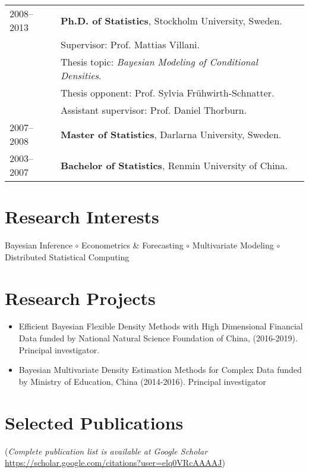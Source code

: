\documentclass[twoside,a4paper,11pt]{amsart}
\begin{document}
\begin{tabular}{ l  p{} l}
  2008--2013 & \textbf{Ph.D. of Statistics}, Stockholm University, Sweden. \\
             & Supervisor: Prof. Mattias Villani.                          \\

             & Thesis topic: \emph{Bayesian Modeling of Conditional Densities}. \\
             & Thesis opponent: Prof. Sylvia Frühwirth-Schnatter.               \\
             & Assistant supervisor: Prof. Daniel Thorburn.                     \\
  2007--2008 & \textbf{Master of Statistics}, Darlarna
                University, Sweden.                                             \\

 2003--2007 & \textbf{Bachelor of Statistics}, Renmin
  University of China. \\
\end{tabular}

\section*{Research Interests}

Bayesian Inference $\circ$ Econometrics \& Forecasting $\circ$ Multivariate
Modeling $\circ$ Distributed Statistical Computing


\section*{Research Projects}
\begin{itemize}
\item Efficient Bayesian Flexible Density Methods with High Dimensional Financial Data
  funded by National Natural Science Foundation of China, (2016-2019). Principal investigator.

\item Bayesian Multivariate Density Estimation Methods for Complex Data funded by Ministry
  of Education, China (2014-2016). Principal investigator

\end{itemize}

\section*{Selected Publications}
{\footnotesize (\emph{Complete publication list is available at Google Scholar}
  \url{https://scholar.google.com/citations?user=elq0VRcAAAAJ})}
\nocite{pan2021note_jbes}
\nocite{talagala2021fformpp_ijf}
\nocite{zhu2021least_jcgs}
\nocite{wang2021uncertainty_jors}
\nocite{kang2021deja_jbr}
\nocite{hao2020bilinear}
\nocite{li2020forecasting}
\nocite{kang2020gratis_sam}
\nocite{li2020fppcn}
\nocite{kalesan2020intersections}
\nocite{bailey2019changes}
\nocite{li2019credit}
\nocite{li2018improving_ijf}
\nocite{pino2018cohort}
\nocite{li2016distributedcn}
\nocite{li2013bayesian}
\nocite{li2013efficient_sjs}
\nocite{li2011modeling}
\nocite{li2010flexible_jspi}
\end{document}
